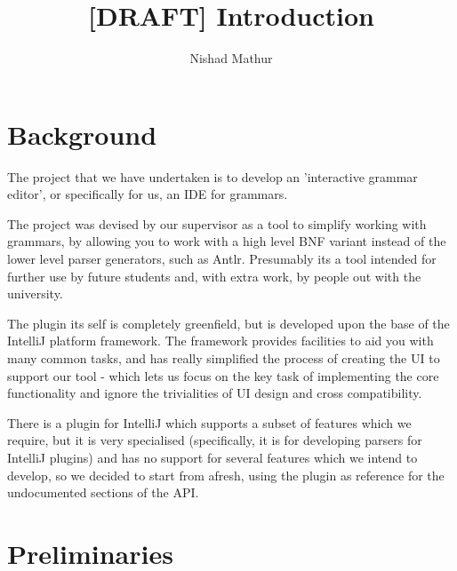 \documentclass[11pt]{article}
\title{[DRAFT] Introduction}
\author{Nishad Mathur}
\begin{document}
\maketitle

%
%
%
%

\section{Background}

The project that we have undertaken is to develop an 'interactive grammar editor', or specifically for us, an IDE for grammars.

The project was devised by our supervisor as a tool to simplify working with grammars, by allowing you to work with a high level BNF variant instead of the lower level parser generators, such as Antlr. Presumably its a tool intended for further use by future students and, with extra work, by people out with the university.

The plugin its self is completely greenfield, but is developed upon the base of the IntelliJ platform framework. The framework provides facilities to aid you with many common tasks, and has really simplified the process of creating the UI to support our tool - which lets us focus on the key task of implementing the core functionality and ignore the trivialities of UI design and cross compatibility.

There is a plugin for IntelliJ which supports a subset of features which we require, but it is very specialised (specifically, it is for developing parsers for IntelliJ plugins) and has no support for several features which we intend to develop, so we decided to start from afresh, using the plugin as reference for the undocumented sections of the API. 

\section{Preliminaries}
\end{document}

